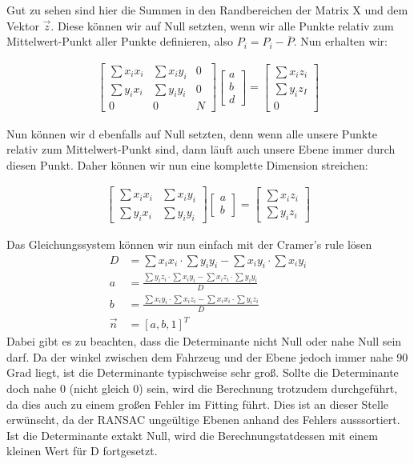 \documentclass[11pt,oneside,openright]{mpreport}
\begin{document}
Gut zu sehen sind hier die Summen in den Randbereichen der Matrix X und dem Vektor $\vec{z}$. Diese können wir auf Null setzten, wenn wir alle Punkte relativ zum Mittelwert-Punkt
aller Punkte definieren, also $P_i = P_i - \overline{P}$. Nun erhalten wir:

\begin{align*}
\begin{bmatrix}
\sum x_i x_i & \sum x_i y_i & 0 \\
\sum y_i x_i & \sum y_i y_i & 0 \\
0 & 0 & N
\end{bmatrix} 
\begin{bmatrix}
a \\
b \\
d 
\end{bmatrix} 
 = 
\begin{bmatrix}
\sum x_i z_i \\
\sum y_i z_I \\
0 
\end{bmatrix} 
\end{align*}

Nun können wir d ebenfalls auf Null setzten, denn wenn alle unsere Punkte relativ zum Mittelwert-Punkt sind, dann läuft auch unsere Ebene immer durch diesen Punkt. Daher können wir 
nun eine komplette Dimension streichen:

\begin{align*}
\begin{bmatrix}
\sum x_i x_i & \sum x_i y_i \\
\sum y_i x_i & \sum y_i y_i
\end{bmatrix} 
\begin{bmatrix}
a \\
b 
\end{bmatrix} 
 = 
\begin{bmatrix}
\sum x_i z_i \\
\sum y_i z_i
\end{bmatrix} 
\end{align*}

Das Gleichungssystem können wir nun einfach mit der Cramer's rule lösen
\begin{align*}
D &= \sum x_i x_i \cdot \sum y_i y_i - \sum x_i y_i \cdot \sum x_i y_i \\
a &= \frac{\sum y_i z_i \cdot \sum x_i y_i - \sum x_i z_i \cdot \sum y_i y_i }{D}\\
b &= \frac{\sum x_i y_i \cdot \sum x_i z_i - \sum x_i x_i \cdot \sum y_i z_i }{D}\\
\vec{n} &= [a, b, 1]^T
\end{align*}
Dabei gibt es zu beachten, dass die Determinante nicht Null oder nahe Null sein darf.
Da der winkel zwischen dem Fahrzeug und der Ebene jedoch immer nahe 90 Grad liegt, ist die Determinante typischweise sehr groß. 
Sollte die Determinante doch nahe 0 (nicht gleich 0) sein, wird die Berechnung trotzudem durchgeführt, da dies auch zu einem 
großen Fehler im Fitting führt. Dies ist an dieser Stelle erwünscht, da der RANSAC ungeültige Ebenen anhand des Fehlers ausssortiert.
Ist die Determinante extakt Null, wird die Berechnungstatdessen mit einem kleinen Wert für D fortgesetzt.
\end{document}
